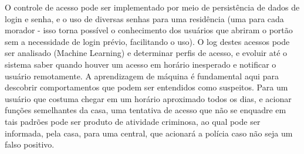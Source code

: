O controle de acesso pode ser implementado por meio de persistência de dados de login e senha, e o uso de diversas senhas para uma residência (uma para cada morador - isso torna possível o conhecimento dos usuários que abriram o portão sem a necessidade de login prévio, facilitando o uso). O log destes acessos pode ser analisado (Machine Learning) e determinar perfis de acesso, e evoluir até o sistema saber quando houver um acesso em horário inesperado e notificar o usuário remotamente. A aprendizagem de máquina é fundamental aqui para descobrir comportamentos que podem ser entendidos como suspeitos. Para um usuário que costuma chegar em um horário aproximado todos os dias, e acionar funções semelhantes da casa, uma tentativa de acesso que não se enquadre em tais padrões pode ser produto de atividade criminosa, ao qual pode ser informada, pela casa, para uma central, que acionará a polícia caso não seja um falso positivo.
